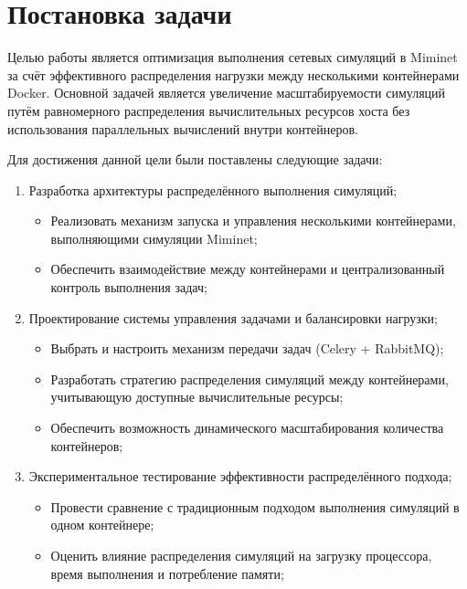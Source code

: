 
\section{Постановка задачи}
\label{sec:task}

Целью работы является оптимизация выполнения сетевых симуляций в Miminet за счёт эффективного распределения нагрузки между несколькими контейнерами Docker.
Основной задачей является увеличение масштабируемости симуляций путём равномерного распределения вычислительных ресурсов хоста без использования параллельных вычислений внутри контейнеров.

Для достижения данной цели были поставлены следующие задачи:
\begin{enumerate}
    \item Разработка архитектуры распределённого выполнения симуляций;
        \begin{itemize}
            \item Реализовать механизм запуска и управления несколькими контейнерами, выполняющими симуляции Miminet;
            \item Обеспечить взаимодействие между контейнерами и централизованный контроль выполнения задач;
        \end{itemize}
    \item Проектирование системы управления задачами и балансировки нагрузки;
        \begin{itemize}
            \item Выбрать и настроить механизм передачи задач (Celery + RabbitMQ);
            \item Разработать стратегию распределения симуляций между контейнерами, учитывающую доступные вычислительные ресурсы;
            \item Обеспечить возможность динамического масштабирования количества контейнеров;
        \end{itemize}
    \item Экспериментальное тестирование эффективности распределённого подхода;
        \begin{itemize}
            \item Провести сравнение с традиционным подходом выполнения симуляций в одном контейнере;
            \item Оценить влияние распределения симуляций на загрузку процессора, время выполнения и потребление памяти;
        \end{itemize}

\end{enumerate}
